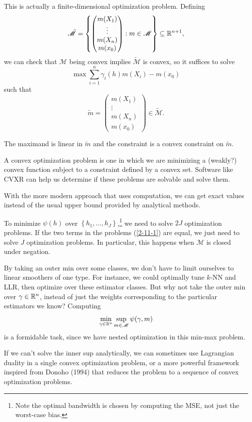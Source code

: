 This is actually a finite-dimensional optimization problem. Defining \[
	\tilde{\mathscr{M}} = \left\{\begin{pmatrix}
	m(X_1) \\
	\vdots \\ m(X_n) \\ m(x_0)
	\end{pmatrix} : m \in \mathscr{M}\right\} \subseteq \mathbb{R}^{n+1}
,\] 
we can check that $\mathscr{M}$ being convex implies $\tilde{\mathscr{M}}$ is convex, so it suffices to solve \[
	\max \sum\limits_{i=1}^{n} \gamma_i(h) m(X_i) - m(x_0)
\] such that \[
	\tilde{m} =  \begin{pmatrix}
	m(X_1) \\
	\vdots \\ m(X_n) \\ m(x_0)
	\end{pmatrix} \in \tilde{\mathscr{M}}	
.\] 

The maximand is linear in $\tilde{m}$ and the constraint is a convex constraint on $\tilde{m}$.

A convex optimization problem is one in which we are minimizing a (weakly?) convex function subject to a constraint defined by a convex set. Software like CVXR can help us determine if these problems are solvable and solve them.

With the more modern approach that uses computation, we can get exact values instead of the usual upper bound provided by analytical methods.

To minimize $\psi(h)$ over $\left\{h_1,\ldots,h_J\right\}$,\footnote{Note the optimal bandwidth is chosen by computing the MSE, not just the worst-case bias.} we need to solve $2J$ optimization problems.
If the two terms in the problems (\ref{2-11-1}) are equal, we just need to solve $J$ optimization problems. In particular, this happens when $\mathscr{M}$ is closed under negation.

By taking an outer min over some classes, we don't have to limit ourselves to linear smoothers of one type. For instance, we could optimally tune $k$-NN and LLR, then optimize over these estimator classes.
But why not take the outer min over $\gamma \in \mathbb{R}^n$, instead of just the weights corresponding to the particular estimators we know?
Computing \[
	\min_{\gamma \in \mathbb{R}^n} \sup_{m \in \mathscr{M}} \psi(\gamma, m)
\] is a formidable task, since we have nested optimization in this min-max problem.

If we can't solve the inner sup analytically, we can sometimes use Lagrangian duality in a single convex optimization problem, or a more powerful framework inspired from Donoho (1994) that reduces the problem to a sequence of convex optimization problems.

